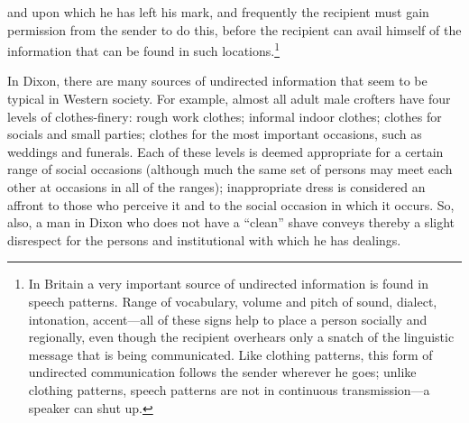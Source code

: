 \documentclass[twoside,symmetric,nobib,justified]{tufte-book}
\begin{document}
and upon which he has left his mark, and frequently the recipient must
gain permission from the sender to do this, before the recipient can
avail himself of the information that can be found in such
locations.\footnote{In Britain a very important source of undirected
  information is found in speech patterns. Range of vocabulary, volume
  and pitch of sound, dialect, intonation, accent---all of these signs
  help to place a person socially and regionally, even though the
  recipient overhears only a snatch of the linguistic message that is
  being communicated. Like clothing patterns, this form of undirected
  communication follows the sender wherever he goes; unlike clothing
  patterns, speech patterns are not in continuous transmission---a
  speaker can shut up.}

In Dixon, there are many sources of undirected information that seem to
be typical in Western society. For example, almost all adult male
crofters have four levels of clothes-finery: rough work clothes;
informal indoor clothes; clothes for socials and small parties; clothes
for the most important occasions, such as weddings and funerals. Each of
these levels is deemed appropriate for a certain range of social
occasions (although much the same set of persons may meet each other at
occasions in all of the ranges); inappropriate dress is considered an
affront to those who perceive it and to the social occasion in which it
occurs. So, also, a man in Dixon who does not have a ``clean'' shave
conveys thereby a slight disrespect for the persons and institutional
with which he has dealings.
\end{document}
